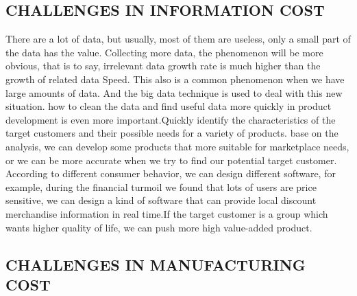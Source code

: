 \documentclass[sigconf]{acmart}
\begin{document}
\subsection{CHALLENGES IN INFORMATION COST}
There are a lot of data, but usually, most of them are useless, only a small part of the data has the value. Collecting more data, the phenomenon will be more obvious, that is to say, irrelevant data growth rate is much higher than the growth of related data Speed. This also is a common phenomenon when we have large amounts of data. And the big data technique is used to deal with this new situation.
how to clean the data and find useful data more quickly in product development is even more important.Quickly identify the characteristics of the target customers and their possible needs for a variety of products. base on the analysis, we can develop some products that more suitable for marketplace needs, or we can be more accurate when we try to find our potential target customer. According to different consumer behavior, we can design different software, for example, during the financial turmoil we found that lots of users are price sensitive, we can design a kind of software that can provide local discount merchandise information in real time.If the target customer is a group which wants higher quality of life, we can push more high value-added product.
\subsection{CHALLENGES IN MANUFACTURING COST}
\end{document}
